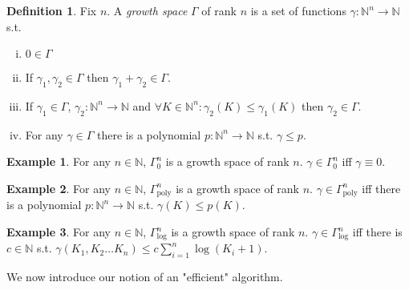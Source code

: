 \documentclass{article}
\numberwithin{equation}{section}
\theoremstyle{definition}
\newtheorem{definition}{Definition}[section]
\newtheorem{example}{Example}[section]
\theoremstyle{plain}
\newcommand{\Nats}{\mathbb{N}}
\begin{document}
\begin{samepage}
\begin{definition}

Fix $n$. A \emph{growth space} $\Gamma$ of rank $n$ is a set of functions ${\gamma: \Nats^n \rightarrow \Nats}$ s.t.

\begin{enumerate}[(i)]

\item $0 \in \Gamma$

\item If $\gamma_1, \gamma_2 \in \Gamma$ then $\gamma_1 + \gamma_2 \in \Gamma$.

\item If $\gamma_1 \in \Gamma$, $\gamma_2: \Nats^n \rightarrow \Nats$ and $\forall K \in \Nats^n: \gamma_2(K) \leq \gamma_1(K)$ then $\gamma_2 \in \Gamma$.

\item For any $\gamma \in \Gamma$ there is a polynomial $p: \Nats^n \rightarrow \Nats$ s.t. $\gamma \leq p$.

\end{enumerate}

\end{definition}
\end{samepage}

\begin{example}

For any $n \in \Nats$, $\Gamma_0^n$ is a growth space of rank $n$. $\gamma \in \Gamma_0^n$ iff $\gamma \equiv 0$.

\end{example}

\begin{example}

For any $n \in \Nats$, $\Gamma_{\text{poly}}^n$ is a growth space of rank $n$. $\gamma \in \Gamma_{\text{poly}}^n$ iff there is a polynomial $p: \Nats^n \rightarrow \Nats$ s.t. $\gamma(K) \leq p(K)$.

\end{example}

\begin{example}

For any $n \in \Nats$, $\Gamma_{\text{log}}^n$ is a growth space of rank $n$. $\gamma \in \Gamma_{\text{log}}^n$ iff there is $c \in \Nats$ s.t. $\gamma(K_1, K_2 \ldots K_n) \leq c \sum_{i=1}^n \log(K_i+1)$.

\end{example}

We now introduce our notion of an "efficient" algorithm.
\end{document}
